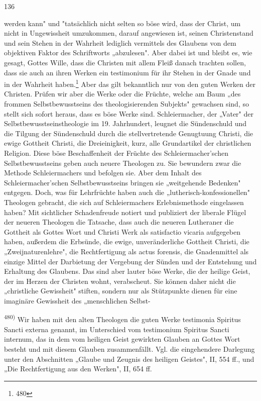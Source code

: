 136


werden kann" und "tatsächlich nicht selten so böse wird, dass der Christ, um nicht in Ungewissheit umzukommen, darauf angewiesen ist, seinen Christenstand und sein Stehen in der Wahrheit lediglich vermittels des Glaubens von dem objektiven Faktor des Schriftworts „abzulesen". Aber dabei ist und bleibt es, wie gesagt, Gottes Wille, dass die Christen mit allem Fleiß danach trachten sollen, dass sie auch an ihren Werken ein testimonium für ihr Stehen in der Gnade und in der Wahrheit haben.\footnote{480} Aber das gilt bekanntlich nur von den guten Werken der Christen. Prüfen wir aber die Werke oder die Früchte, welche am Baum „des frommen Selbstbewusstseins des theologisierenden Subjekts" gewachsen sind, so stellt sich sofort heraus, dass es böse Werke sind. Schleiermacher, der „Vater" der Selbstbewusstseinstheologie im 19. Jahrhundert, leugnet die Sündenschuld und die Tilgung der Sündenschuld durch die stellvertretende Genugtuung Christi, die ewige Gottheit Christi, die Dreieinigkeit, kurz, alle Grundartikel der christlichen Religion. Diese böse Beschaffenheit der Früchte des Schleiermacher’schen Selbstbewusstseins geben auch neuere Theologen zu. Sie bewundern zwar die Methode Schleiermachers und befolgen sie. Aber dem Inhalt des Schleiermacher’schen Selbstbewusstseins bringen sie „weitgehende Bedenken" entgegen. Doch, was für Lehrfrüchte haben auch die „lutherisch-konfessionellen" Theologen gebracht, die sich auf Schleiermachers Erlebnismethode eingelassen haben? Mit sichtlicher Schadenfreude notiert und publiziert der liberale Flügel der neueren Theologen die Tatsache, dass auch die neueren Lutheraner die Gottheit als Gottes Wort und Christi Werk als satisfactio vicaria aufgegeben haben, außerdem die Erbsünde, die ewige, unveränderliche Gottheit Christi, die „Zweijnaturenlehre", die Rechtfertigung als actus forensis, die Gnadenmittel als einzige Mittel der Darbietung der Vergebung der Sünden und der Entstehung und Erhaltung des Glaubens. Das sind aber lauter böse Werke, die der heilige Geist, der im Herzen der Christen wohnt, verabscheut. Sie können daher nicht die „christliche Gewissheit" stiften, sondern nur als Stützpunkte dienen für eine imaginäre Gewissheit des „menschlichen Selbst-

\textsuperscript{480)} Wir haben mit den alten Theologen die guten Werke testimonia Spiritus Sancti externa genannt, im Unterschied vom testimonium Spiritus Sancti internum, das in dem vom heiligen Geist gewirkten Glauben an Gottes Wort besteht und mit diesem Glauben zusammenfällt. Vgl. die eingehendere Darlegung unter den Abschnitten „Glaube und Zeugnis des heiligen Geistes", II, 554 ff., und „Die Rechtfertigung aus den Werken", II, 654 ff.